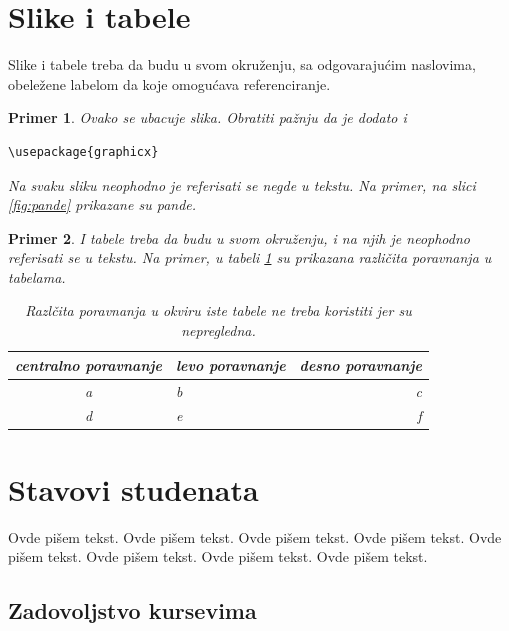 \documentclass[a4paper]{article}
\newtheorem{primer}{Primer}[section]
\begin{document}
\section{Slike i tabele}
\label{slike_i_tabele}

Slike i tabele treba da budu u svom okruženju, sa odgovarajućim naslovima, obeležene labelom da koje omogućava referenciranje. 

\begin{primer} Ovako se ubacuje slika. Obratiti pažnju da je dodato i 
\begin{verbatim}
\usepackage{graphicx}
\end{verbatim}


Na svaku sliku neophodno je referisati se negde u tekstu. Na primer, na slici \ref{fig:pande} prikazane su pande. 
\end{primer}

\begin{primer} I tabele treba da budu u svom okruženju, i na njih je neophodno referisati se u tekstu. Na primer, u tabeli \ref{tab:tabela1} su prikazana različita poravnanja u tabelama.

\begin{table}[h!]
\begin{center}
\caption{Razlčita poravnanja u okviru iste tabele ne treba koristiti jer su nepregledna.}
\begin{tabular}{|c|l|r|} \hline
centralno poravnanje& levo poravnanje& desno poravnanje\\ \hline
a &b&c\\ \hline
d &e&f\\ \hline
\end{tabular}
\label{tab:tabela1}
\end{center}
\end{table}

\end{primer}




\section{Stavovi studenata}
\label{sec:stavovi_studenata}


Ovde pišem tekst. 
Ovde pišem tekst. 
Ovde pišem tekst. 
Ovde pišem tekst. 
Ovde pišem tekst. 
Ovde pišem tekst. 
Ovde pišem tekst. 
Ovde pišem tekst. 


\subsection{Zadovoljstvo kursevima}
\label{subsec:zadovoljstvo_kursevima}
\end{document}
